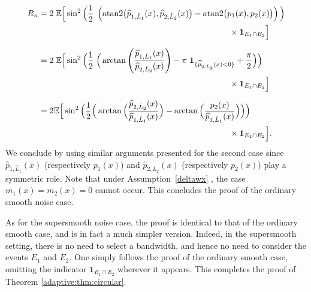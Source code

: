 \documentclass[11pt,a4paper,openany]{article}
\newcommand{\Atan}{\mbox{atan2}}
\def\E{\mathbb{E}}
\begin{document}
\begin{align*}
	R_n  &= 2 \hspace{0.1cm}   \E \Big[ \sin^2 \Big( \frac{1}{2}  \hspace{0.1cm}   \left (  \Atan \big( \widehat{p}_{1, \hat L_1}(x) , \widehat{p}_{2, \hat L_2}(x)\big)  -  \Atan \big( p_{1}(x), p_{2}(x)\big)  \right ) \Big) 
	\\
	& \hspace{8cm}   \times   \mathbf{1}_{E_1 \cap  E_2 } \Big]
	\\[0.2cm]  
	&= 2  \hspace{0.1cm}  \E \Big[ \sin^2 \Big( \frac{1}{2}  \hspace{0.1cm}    \Big(  \arctan \Bigg( \dfrac{ \widehat{p}_{1, \hat L_1}(x)}{ \widehat{p}_{2, \hat L_2}(x)}  \Bigg) - \pi  \hspace{0.1cm}  \mathbf{1}_{\{ \widehat{p}_{2, \hat L_2}(x) < 0\}}  + \frac{\pi}{2}  \Big) \Big)  
	\\
	& \hspace{8cm}  \times    \mathbf{1}_{E_1 \cap  E_2 } \Big]
	\\[0.2cm]  
	&= 2  \hspace{0.01cm}  \E \Big[ \sin^2 \Big( \frac{1}{2}    \hspace{0.01cm}   \Big(  \arctan \Big( \dfrac{ \widehat{p}_{2, \hat L_2}(x)}{ \widehat{p}_{1, \hat L_1}(x)}  \Big) -\arctan \Big( \dfrac{ p_{2}(x)}{ \widehat{p}_{1, \hat L_1}(x)}  \Big) \Big) \Big) 
	\\
	& \hspace{8cm}  \times   \mathbf{1}_{E_1 \cap   E_2 } \Big].
\end{align*}
We conclude by using similar arguments presented for the second case since $ \widehat{p}_{1, \hat L_1}(x)$ (respectively $p_{1}(x)$) and  $ \widehat{p}_{2, \hat L_2}(x)$ (respectively $p_{2}(x)$) play a symmetric role.
Note that under Assumption~\eqref{deltawx}%
, the case $m_1(x) = m_2(x) = 0$ cannot occur. 
This concludes the proof of the ordinary smooth noise case.



As for the supersmooth noise case, the proof is identical to that of the ordinary smooth case, and is in fact a much simpler version. Indeed, in the supersmooth setting, there is no need to select a bandwidth, and hence no need to consider the events $ E_1$ and $ E_2$. One simply follows the proof of the ordinary smooth case, omitting the indicator $\mathbf{1}_{E_1 \cap   E_2 } $ wherever it appears. This completes the proof of  Theorem \ref{adaptive:thm:circular}.
\end{document}
